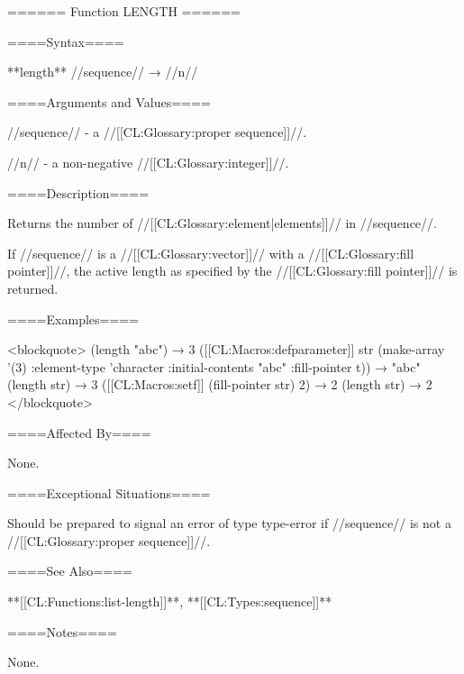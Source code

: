 ====== Function LENGTH ======

====Syntax====

**length** //sequence// → //n//

====Arguments and Values====

//sequence// - a //[[CL:Glossary:proper sequence]]//.

//n// - a non-negative //[[CL:Glossary:integer]]//.

====Description====

Returns the number of //[[CL:Glossary:element|elements]]// in //sequence//.

If //sequence// is a //[[CL:Glossary:vector]]// with a //[[CL:Glossary:fill pointer]]//, the active length as specified by the //[[CL:Glossary:fill pointer]]// is returned.

====Examples====

<blockquote> (length "abc") → 3 ([[CL:Macros:defparameter]] str (make-array '(3) :element-type 'character :initial-contents "abc" :fill-pointer t)) → "abc" (length str) → 3 ([[CL:Macros:setf]] (fill-pointer str) 2) → 2 (length str) → 2 </blockquote>

====Affected By====

None.

====Exceptional Situations====

Should be prepared to signal an error of type type-error if //sequence// is not a //[[CL:Glossary:proper sequence]]//.

====See Also====

**[[CL:Functions:list-length]]**, **[[CL:Types:sequence]]**

====Notes====

None.

